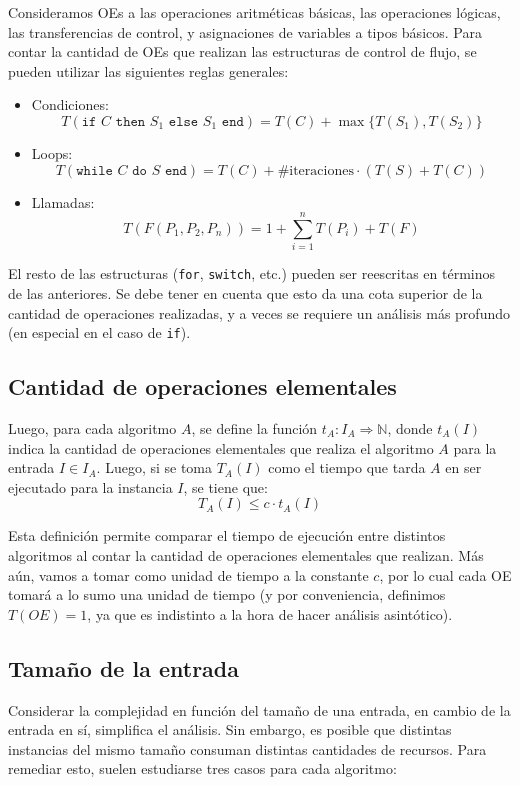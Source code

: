 \documentclass{article}
\newcommand{\code}{\texttt}
\begin{document}
Consideramos OEs a las operaciones aritméticas básicas, las operaciones lógicas, las transferencias de control, y asignaciones de variables a tipos básicos. Para contar la cantidad de OEs que realizan las estructuras de control de flujo, se pueden utilizar las siguientes reglas generales:
\begin{itemize}
    \item Condiciones:
          $$T(\code{if $C$ then $S_1$ else $S_1$ end}) = T(C) + \max{\{T(S_1), T(S_2)\}}$$
    \item Loops:
          $$T(\code{while $C$ do $S$ end}) = T(C) + \text{\#iteraciones} \cdot (T(S) + T(C))$$
    \item Llamadas:
          $$T(F(P_1, P_2, P_n)) = 1 + \sum_{i = 1}^n T(P_i) + T(F)$$
\end{itemize}

El resto de las estructuras (\code{for}, \code{switch}, etc.) pueden ser reescritas en términos de las anteriores. Se debe tener en cuenta que esto da una cota superior de la cantidad de operaciones realizadas, y a veces se requiere un análisis más profundo (en especial en el caso de \code{if}).

\subsection{Cantidad de operaciones elementales}

Luego, para cada algoritmo $A$, se define la función $t_A: I_A \Rightarrow \mathbb{N}$, donde $t_A(I)$ indica la cantidad de operaciones elementales que realiza el algoritmo $A$ para la entrada $I \in I_A$. Luego, si se toma $T_A(I)$ como el tiempo que tarda $A$ en ser ejecutado para la instancia $I$, se tiene que:
$$ T_A(I) \leq c \cdot t_A(I) $$

Esta definición permite comparar el tiempo de ejecución entre distintos algoritmos al contar la cantidad de operaciones elementales que realizan. Más aún, vamos a tomar como unidad de tiempo a la constante $c$, por lo cual cada OE tomará a lo sumo una unidad de tiempo (y por conveniencia, definimos $T(OE) = 1$, ya que es indistinto a la hora de hacer análisis asintótico).

\subsection{Tamaño de la entrada}

Considerar la complejidad en función del tamaño de una entrada, en cambio de la entrada en sí, simplifica el análisis. Sin embargo, es posible que distintas instancias del mismo tamaño consuman distintas cantidades de recursos. Para remediar esto, suelen estudiarse tres casos para cada algoritmo:
\end{document}
